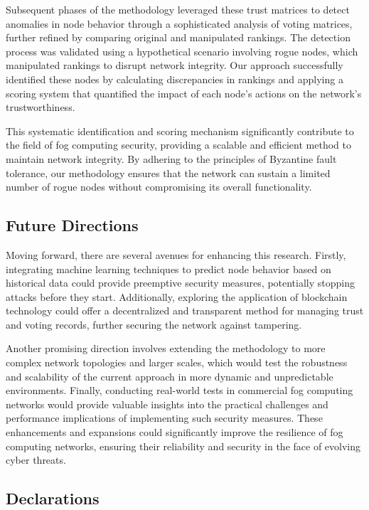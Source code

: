 \documentclass{sn-jnl}%
\begin{document}
Subsequent phases of the methodology leveraged these trust matrices to detect anomalies in node behavior through a sophisticated analysis of voting matrices, further refined by comparing original and manipulated rankings. The detection process was validated using a hypothetical scenario involving rogue nodes, which manipulated rankings to disrupt network integrity. Our approach successfully identified these nodes by calculating discrepancies in rankings and applying a scoring system that quantified the impact of each node's actions on the network's trustworthiness.

This systematic identification and scoring mechanism significantly contribute to the field of fog computing security, providing a scalable and efficient method to maintain network integrity. By adhering to the principles of Byzantine fault tolerance, our methodology ensures that the network can sustain a limited number of rogue nodes without compromising its overall functionality.

\subsection{Future Directions}

Moving forward, there are several avenues for enhancing this research. Firstly, integrating machine learning techniques to predict node behavior based on historical data could provide preemptive security measures, potentially stopping attacks before they start. Additionally, exploring the application of blockchain technology could offer a decentralized and transparent method for managing trust and voting records, further securing the network against tampering.

Another promising direction involves extending the methodology to more complex network topologies and larger scales, which would test the robustness and scalability of the current approach in more dynamic and unpredictable environments. Finally, conducting real-world tests in commercial fog computing networks would provide valuable insights into the practical challenges and performance implications of implementing such security measures. These enhancements and expansions could significantly improve the resilience of fog computing networks, ensuring their reliability and security in the face of evolving cyber threats.







\subsection *{Declarations}
\end{document}
